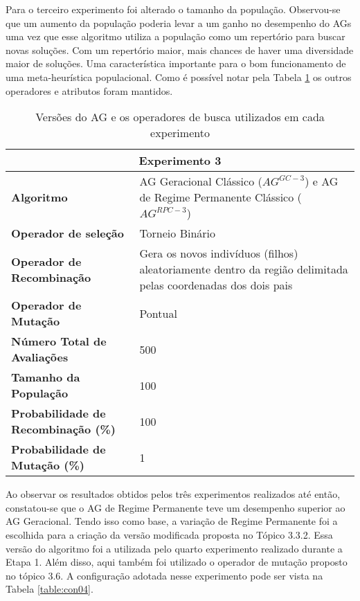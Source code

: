 Para o terceiro experimento foi alterado o tamanho da população. Observou-se que um  aumento da população  poderia levar a um ganho no desempenho do AGs uma vez que esse algoritmo utiliza a população como um repertório para buscar novas soluções. Com um repertório maior, mais chances de haver uma diversidade maior de soluções. Uma característica importante para o bom funcionamento de uma meta-heurística populacional. Como é possível notar pela Tabela \ref{table:con03} os outros operadores e atributos foram mantidos.
\begin{table}[H]
\centering
\caption{Versões do AG e os operadores de busca utilizados em cada experimento}
\label{table:con03}
\begin{tabular}{|p{6cm}|p{9cm}|}
\hline

\multicolumn{2}{|c|}{\textbf{Experimento 3}} \\ \hline
\textbf{Algoritmo} & AG Geracional Clássico ($AG^{GC-3}$) e AG de Regime Permanente Clássico ($AG^{RPC-3}$) \\ \hline
\textbf{Operador de seleção} & Torneio Binário \\ \hline
\textbf{Operador de Recombinação} & Gera os novos indivíduos (filhos) aleatoriamente dentro da região delimitada pelas coordenadas dos dois pais \\  \hline
\textbf{Operador de Mutação} & Pontual \\ \hline
\textbf{Número Total de Avaliações} & 500 \\ \hline
\textbf{Tamanho da População} & 100 \\ \hline
\textbf{Probabilidade de Recombinação (\%)} & 100 \\ \hline
\textbf{Probabilidade de Mutação (\%)} & 1 \\ \hline
 \end{tabular}
\end{table}

Ao observar os resultados obtidos pelos três experimentos realizados até então, constatou-se que o AG de Regime Permanente teve um desempenho superior ao AG Geracional. Tendo isso como base, a variação de Regime Permanente foi a escolhida para a criação da versão modificada proposta no Tópico 3.3.2. Essa versão do algoritmo foi a utilizada pelo quarto experimento realizado durante a Etapa 1. Além disso, aqui também foi utilizado o operador de mutação proposto no tópico 3.6. A configuração adotada nesse experimento pode ser vista na Tabela \ref{table:con04}.

